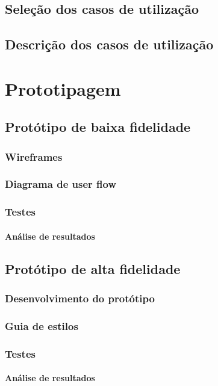 \documentclass[11pt, twoside]{report}
\begin{document}
	\section{Seleção dos casos de utilização}
	\section{Descrição dos casos de utilização}
	
	\chapter{Prototipagem}
	\section{Protótipo de baixa fidelidade}
	\subsection{Wireframes}
	\subsection{Diagrama de user flow}
	\subsection{Testes}
	\subsubsection{Análise de resultados}
	
	\section{Protótipo de alta fidelidade}
	\subsection{Desenvolvimento do protótipo}
	\subsection{Guia de estilos}
	\subsection{Testes}
	\subsubsection{Análise de resultados}
	
\end{document}
